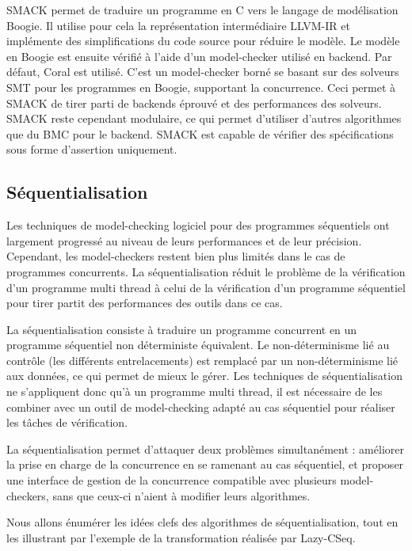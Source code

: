SMACK\cite{SMACK} permet de traduire un programme en C vers le langage de
modélisation Boogie. Il utilise pour cela la représentation
intermédiaire LLVM-IR et implémente des simplifications du code source pour
réduire le modèle. Le modèle en Boogie est ensuite vérifié à l'aide d'un
model-checker utilisé en backend. Par défaut, Coral est utilisé. C'est un
model-checker borné se basant sur des solveurs SMT pour les programmes en
Boogie, supportant la concurrence. Ceci permet à SMACK de tirer parti de
backends éprouvé et des performances des solveurs. SMACK reste cependant
modulaire, ce qui permet d'utiliser d'autres algorithmes que du BMC pour le
backend. SMACK est capable de vérifier des spécifications sous forme d'assertion
uniquement.

\subsection{Séquentialisation}

Les techniques de model-checking logiciel pour des programmes séquentiels ont
largement progressé au niveau de leurs performances et de leur précision.
Cependant, les model-checkers restent bien plus limités dans le cas de
programmes concurrents. La séquentialisation réduit le problème de la
vérification d'un programme multi thread à celui de la vérification d'un
programme séquentiel pour tirer partit des performances des outils dans ce cas.

La séquentialisation consiste à traduire un programme concurrent en un programme
séquentiel non déterministe équivalent. Le non-déterminisme lié au contrôle (les
différents entrelacements) est remplacé par un non-déterminisme lié aux données,
ce qui permet de mieux le gérer. Les techniques de séquentialisation ne
s'appliquent donc qu'à un programme multi thread, il est nécessaire de les
combiner avec un outil de model-checking adapté au cas séquentiel pour réaliser
les tâches de vérification.

La séquentialisation permet d'attaquer deux problèmes simultanément : améliorer
la prise en charge de la concurrence en se ramenant au cas séquentiel, et
proposer une interface de gestion de la concurrence compatible avec plusieurs
model-checkers, sans que ceux-ci n'aient à modifier leurs algorithmes.

Nous allons énumérer les idées clefs des algorithmes de séquentialisation, tout
en les illustrant par l'exemple de la transformation réalisée par
Lazy-CSeq\cite{LazyCSeq}.

